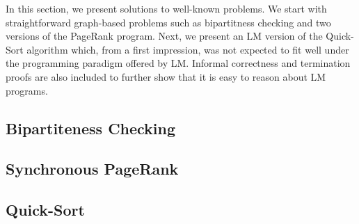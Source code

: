 In this section, we present solutions to well-known problems. We start with
straightforward graph-based problems such as bipartitness checking and two
versions of the PageRank program. Next, we present an LM version of the
Quick-Sort algorithm which, from a first impression, was not expected to fit
well under the programming paradigm offered by LM. Informal correctness and
termination proofs are also included to further show that it is easy to reason
about LM programs.

\subsection{Bipartiteness Checking}

\subsection{Synchronous PageRank}\label{section:language:pagerank}

\subsection{Quick-Sort}

